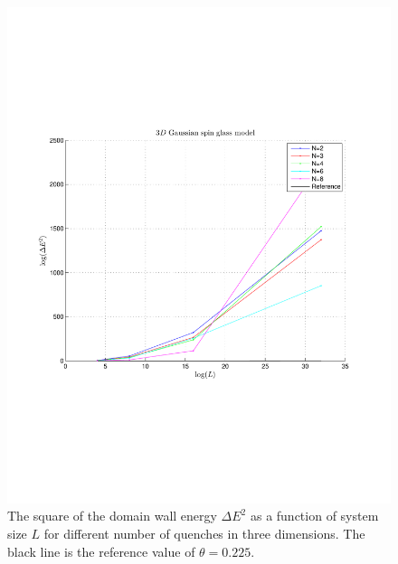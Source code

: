\documentclass[paper=a4, fontsize=11pt]{scrartcl} %
\numberwithin{equation}{section} %
\numberwithin{figure}{section} %
\numberwithin{table}{section} %
\begin{document}
\begin{figure}
\centering
\includegraphics[width=\textwidth]{images/spinglass3D_large.pdf}
\caption{The square of the domain wall energy $\Delta E ^ 2$ as a function of system size $L$ for different number of quenches in three dimensions. The black line is the reference value of $\theta=0.225$.}
\label{fig:E_3D_large}
\end{figure}
\end{document}
